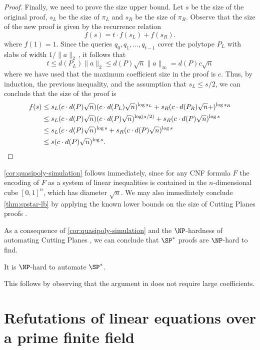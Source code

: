 \begin{proof}
	Finally, we need to prove the size upper bound. Let $s$ be the size of the original proof, $s_L$ be the size of $\pi_L$ and $s_R$ be the size of $\pi_R$. Observe that the size of the new proof is given by the recurrence relation
	\[ f(s) = t \cdot f(s_L)+f(s_R). \] 
	where $f(1) = 1$. Since the queries $q_0,q_1,\ldots, q_{t-1}$ cover the polytope $P_L$ with slabs of width $1/\|a\|_2\,$, it follows that
	\[ t \leq d(P_L) \|a\|_2 \leq d(P) \sqrt{n} \|a\|_\infty =d(P)c \sqrt{n} \]
	where we have used that the maximum coefficient size in the proof is $c$. Thus, by induction, the previous inequality, and the assumption that $s_L \leq s/2$, we can conclude that the size of the proof is
	\begin{align*}
		f(s) &\leq s_L(c \cdot d(P) \sqrt{n})(c \cdot d(P_L) \sqrt{n})^{\log s_L} + s_R(c \cdot d(P_R) \sqrt{n} +)^{\log s_R} \\
		&\leq s_L(c \cdot d(P) \sqrt{n})(c \cdot d(P) \sqrt{n})^{\log (s/2)} + s_R(c \cdot d(P) \sqrt{n} )^{\log s}\\
		&\leq s_L(c \cdot d(P) \sqrt{n})^{\log s} + s_R(c \cdot d(P) \sqrt{n})^{\log s} \\
		&\leq s(c \cdot d(P) \sqrt{n})^{\log s}. \qedhere
	\end{align*}
\end{proof}

\autoref{cor:quasipoly-simulation} follows immediately, since for any CNF formula $F$ the encoding of $F$ as a system of linear inequalities is contained in the $n$-dimensional cube $[0,1]^n$, which has diameter $\sqrt{n}$. 
We may also immediately conclude \autoref{thm:spstar-lb} by applying the known lower bounds on the size of Cutting Planes proofs \cite{Pudlak97,FlemingPPR17,HrubesP17,GargGKS18}. 

As a consequence of \autoref{cor:quasipoly-simulation} and the
%
$\NP$-hardness of automating %
Cutting Planes \cite{GoosKMP20}, we can conclude that $\SP^*$ proofs
%
%
%
%
%
are $\NP$-hard to find.   %
%

\begin{corollary}
\label{cor:non-automatability} 
%
%
It is $\NP$-hard to automate $\SP^*$.   %
%
\end{corollary}
This follows by observing that the argument in \cite{GoosKMP20} does not
require large coefficients.








\section{Refutations of linear equations over a prime finite field}\label{sec:qpSPref}

